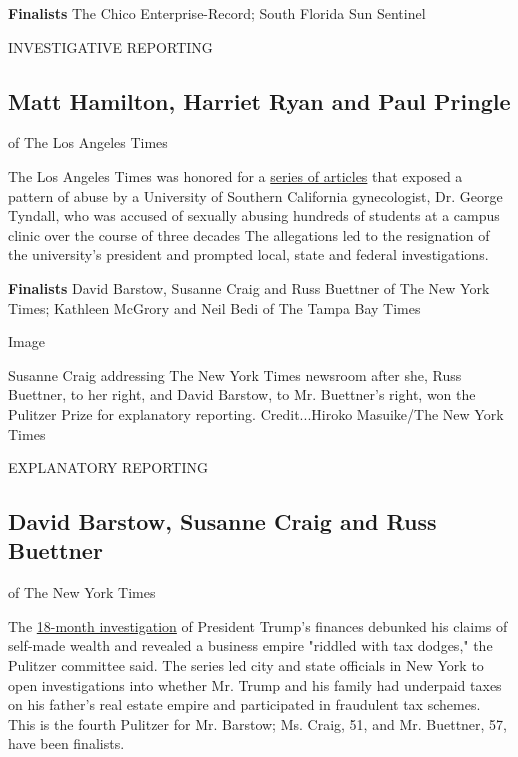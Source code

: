 \textbf{Finalists} The Chico Enterprise-Record; South Florida Sun
Sentinel

INVESTIGATIVE REPORTING

\hypertarget{matt-hamilton-harriet-ryan-and-paul-pringle}{%
\subsection{Matt Hamilton, Harriet Ryan and Paul
Pringle}\label{matt-hamilton-harriet-ryan-and-paul-pringle}}

of The Los Angeles Times

The Los Angeles Times was honored for a
\href{https://www.latimes.com/local/lanow/la-me-times-pulitzer-george-tyndall-usc-20190414-story.html}{series
of articles} that exposed a pattern of abuse by a University of Southern
California gynecologist, Dr. George Tyndall, who was accused of sexually
abusing hundreds of students at a campus clinic over the course of three
decades The allegations led to the resignation of the university's
president and prompted local, state and federal investigations.

\textbf{Finalists} David Barstow, Susanne Craig and Russ Buettner of The
New York Times; Kathleen McGrory and Neil Bedi of The Tampa Bay Times

Image

Susanne Craig addressing The New York Times newsroom after she, Russ
Buettner, to her right, and David Barstow, to Mr. Buettner's right, won
the Pulitzer Prize for explanatory reporting. Credit...Hiroko
Masuike/The New York Times

EXPLANATORY REPORTING

\hypertarget{david-barstow-susanne-craig-and-russ-buettner}{%
\subsection{David Barstow, Susanne Craig and Russ
Buettner}\label{david-barstow-susanne-craig-and-russ-buettner}}

of The New York Times

The
\href{https://www.nytimes3xbfgragh.onion/interactive/2018/10/02/us/politics/donald-trump-tax-schemes-fred-trump.html?module=inline}{18-month
investigation} of President Trump's finances debunked his claims of
self-made wealth and revealed a business empire "riddled with tax
dodges," the Pulitzer committee said. The series led city and state
officials in New York to open investigations into whether Mr. Trump and
his family had underpaid taxes on his father's real estate empire and
participated in fraudulent tax schemes. This is the fourth Pulitzer for
Mr. Barstow; Ms. Craig, 51, and Mr. Buettner, 57, have been finalists.

